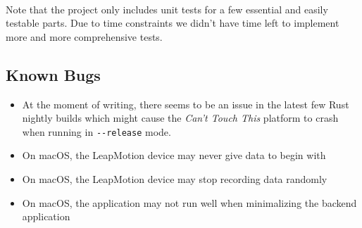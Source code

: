 \documentclass{standalone}
\begin{document}
  \paragraph{}
  Note that the project only includes unit tests for a few essential and easily
  testable parts. Due to time constraints we didn't have time left to implement
  more and more comprehensive tests.

  \subsection{Known Bugs}
  \begin{itemize}
    \tightlist{}
    \item At the moment of writing, there seems to be an issue in the latest
      few Rust nightly builds which might cause the \textit{Can't Touch This}
      platform to crash when running in \verb_--release_ mode.
    \item On macOS, the LeapMotion device may never give data to begin with
    \item On macOS, the LeapMotion device may stop recording data randomly
    \item On macOS, the application may not run well when minimalizing the
      backend application
  \end{itemize}
\end{document}
